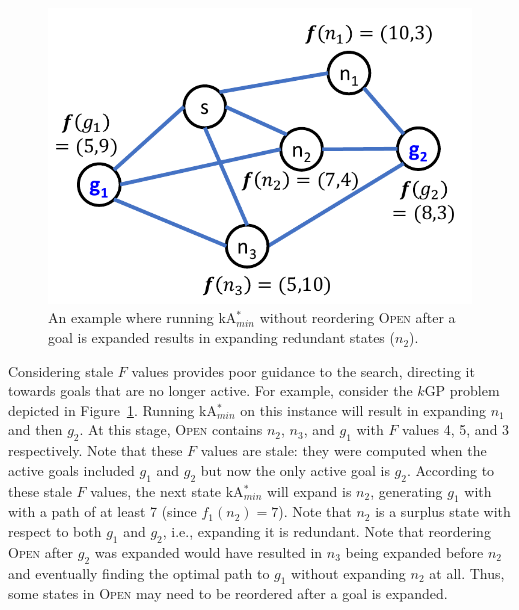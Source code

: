\documentclass{aicom2e}
\newcommand{\kgs}{$k$GP}
\newcommand{\kastarmin}{kA$^*_{min}$}
\newcommand{\kastarmax}{kA$^*_{max}$}
\newcommand{\open}{\textsc{Open}}
\begin{document}
\begin{figure}
    \includegraphics[width=0.7\columnwidth]{need-resort_cropped.pdf}
    \caption{An example where running \kastarmin{} without reordering \open{} after a goal is expanded
        results in expanding redundant states ($n_2$).}
    \label{fig:need-resort}
\end{figure}

Considering stale $F$ values provides poor guidance to the search, directing it towards goals that are no longer active. For example, consider the \kgs{} problem depicted in Figure~\ref{fig:need-resort}. Running \kastarmin{} on this instance will result in expanding $n_1$ and then $g_2$. At this stage, \open{} contains $n_2$, $n_3$, and $g_1$ with $F$ values 4, 5, and 3 respectively.
Note that these $F$ values are stale: they
were computed when the active goals included $g_1$ and $g_2$
but now the only active goal is $g_2$.
According to these stale $F$ values, the next state \kastarmin{}
will expand is $n_2$, generating $g_1$ with with a path of at least 7
(since $f_1(n_2)=7$). Note that $n_2$ is a surplus state with respect to both $g_1$ and $g_2$, i.e., expanding it is redundant. Note that reordering \open{} after $g_2$ was expanded would have resulted in $n_3$ being expanded before $n_2$ and eventually finding the optimal path to $g_1$ without expanding $n_2$ at all. Thus, some states in \open{} may need to be reordered after a goal is expanded.

\end{document}
